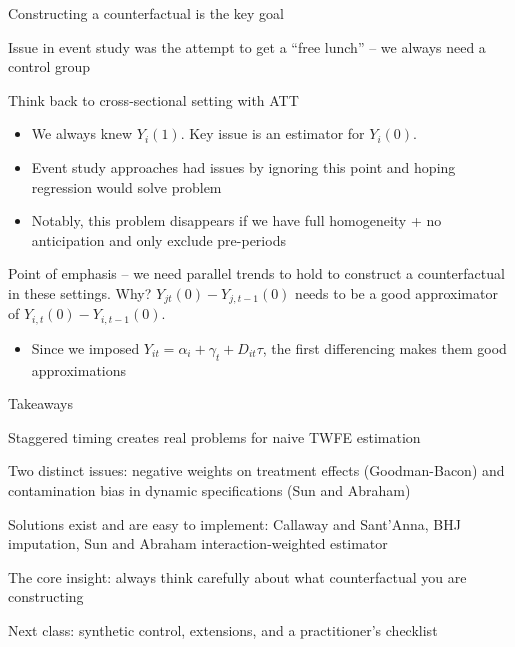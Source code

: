 \documentclass[notes,11pt, aspectratio=169]{beamer}
\newenvironment{wideitemize}{\itemize\addtolength{\itemsep}{10pt}}{\enditemize}
\begin{document}
\begin{frame}{Constructing a counterfactual is the key goal}
	\begin{wideitemize}
		\item Issue in event study was the attempt to get a ``free lunch''
		-- we always need a control group
		\item   Think back to cross-sectional setting with ATT
		\begin{itemize}
			\item We always knew $Y_{i}(1)$. Key issue is an estimator for $Y_{i}(0)$.
			\item Event study approaches had issues by ignoring this point and hoping regression would solve problem
			\item Notably, this problem disappears if we have full homogeneity + no anticipation and only exclude pre-periods
		\end{itemize}
		\item Point of emphasis -- we need parallel trends to hold to
		construct a counterfactual in these settings. Why?
		$Y_{jt}(0) - Y_{j,t-1}(0)$ needs to be a good approximator of
		$Y_{i,t}(0) - Y_{i,t-1}(0)$.
		\begin{itemize}
			\item Since we imposed
			      $Y_{it} = \alpha_{i} + \gamma_{t} + D_{it}\tau$, the first
			      differencing makes them good approximations
		\end{itemize}
	\end{wideitemize}
\end{frame}

\begin{frame}{Takeaways}
	\begin{wideitemize}
		\item Staggered timing creates real problems for naive TWFE estimation
		\item Two distinct issues: negative weights on treatment effects (Goodman-Bacon) and contamination bias in dynamic specifications (Sun and Abraham)
		\item Solutions exist and are easy to implement: Callaway and Sant'Anna, BHJ imputation, Sun and Abraham interaction-weighted estimator
		\item The core insight: always think carefully about what counterfactual you are constructing
		\item Next class: synthetic control, extensions, and a practitioner's checklist
	\end{wideitemize}
\end{frame}
\end{document}
